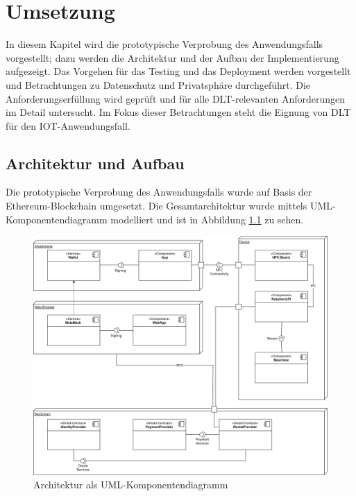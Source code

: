 \chapter{Umsetzung}
\label{ch:implementation}
In diesem Kapitel wird die prototypische Verprobung des Anwendungsfalls vorgestellt; dazu werden die Architektur und der Aufbau der Implementierung aufgezeigt. Das Vorgehen für das Testing und das Deployment werden vorgestellt und Betrachtungen zu Datenschutz und Privatsphäre durchgeführt. Die Anforderungserfüllung wird geprüft und für alle \ac{DLT}-relevanten Anforderungen im Detail untersucht. Im Fokus dieser Betrachtungen steht die Eignung von \ac{DLT} für den \ac{IOT}-Anwendungsfall.

\section{Architektur und Aufbau}
\label{sec:implementation:poc:architecture}
Die prototypische Verprobung des Anwendungsfalls wurde auf Basis der Ethereum-Blockchain umgesetzt. Die Gesamtarchitektur wurde mittels \ac{UML}-Komponentendiagramm modelliert und ist in Abbildung \ref{fig:chapter07:architecture} zu sehen.

\begin{figure}[h]
 \centering
 \includegraphics[width=1.0\textwidth]{gfx/Architecture.png}
 \caption{Architektur als UML-Komponentendiagramm}
 \label{fig:chapter07:architecture}
\end{figure}

